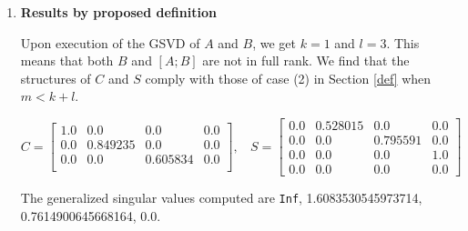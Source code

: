     \begin{enumerate}[(1).]
        \item \textbf{Results by proposed definition}
        
            Upon execution of the GSVD of $A$ and $B$, we get $k = 1$ and $l = 3$. This means that both $B$ and $[A; B]$ are not in full rank. We find that the structures of $C$ and $S$ comply with those of case (2) in Section \ref{def} when $m < k+l$.
            
            \begin{equation*}
                C = \begin{bmatrix}
                 1.0 & 0.0      & 0.0      & 0.0 \\
                 0.0 & 0.849235 & 0.0      & 0.0 \\
                 0.0 & 0.0      & 0.605834 & 0.0 \\
                \end{bmatrix} , \ \ \ \
                S = \begin{bmatrix}
                 0.0 & 0.528015 & 0.0       & 0.0 \\
                 0.0 & 0.0      & 0.795591  & 0.0 \\
                 0.0 & 0.0      & 0.0       & 1.0 \\
                 0.0 & 0.0      & 0.0       & 0.0
                \end{bmatrix}
            \end{equation*}
    
            The generalized singular values computed are \texttt{Inf}, 1.6083530545973714, 0.7614900645668164, 0.0.


\end{enumerate}
